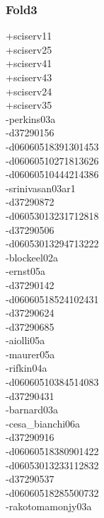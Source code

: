 \begin{multicols}{3}
\subsubsection*{Fold3}
+sciserv11\\
+sciserv25\\
+sciserv41\\
+sciserv43\\
+sciserv24\\
+sciserv35\\
-perkins03a\\
-d37290156\\
-d06060518391301453\\
-d06060510271813626\\
-d06060510444214386\\
-srinivasan03ar1\\
-d37290872\\
-d06053013231712818\\
-d37290506\\
-d06053013294713222\\
-blockeel02a\\
-ernst05a\\
-d37290142\\
-d06060518524102431\\
-d37290624\\
-d37290685\\
-aiolli05a\\
-maurer05a\\
-rifkin04a\\
-d06060510384514083\\
-d37290431\\
-barnard03a\\
-cesa\_bianchi06a\\
-d37290916\\
-d06060518380901422\\
-d06053013233112832\\
-d37290537\\
-d06060518285500732\\
-rakotomamonjy03a\\

\end{multicols}
